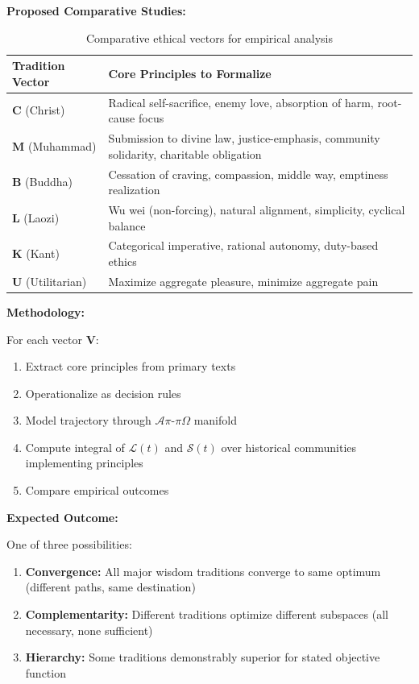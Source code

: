 \documentclass[11pt,a4paper]{article}
\theoremstyle{definition}
\theoremstyle{remark}
\begin{document}
\textbf{Proposed Comparative Studies:}

\begin{table}[h]
\centering
\small
\begin{tabular}{|l|p{7cm}|}
\hline
\textbf{Tradition Vector} & \textbf{Core Principles to Formalize} \\
\hline
$\mathbf{C}$ (Christ) & Radical self-sacrifice, enemy love, absorption of harm, root-cause focus \\
\hline
$\mathbf{M}$ (Muhammad) & Submission to divine law, justice-emphasis, community solidarity, charitable obligation \\
\hline
$\mathbf{B}$ (Buddha) & Cessation of craving, compassion, middle way, emptiness realization \\
\hline
$\mathbf{L}$ (Laozi) & Wu wei (non-forcing), natural alignment, simplicity, cyclical balance \\
\hline
$\mathbf{K}$ (Kant) & Categorical imperative, rational autonomy, duty-based ethics \\
\hline
$\mathbf{U}$ (Utilitarian) & Maximize aggregate pleasure, minimize aggregate pain \\
\hline
\end{tabular}
\caption{Comparative ethical vectors for empirical analysis}
\end{table}

\textbf{Methodology:}

For each vector $\mathbf{V}$:
\begin{enumerate}
\item Extract core principles from primary texts
\item Operationalize as decision rules
\item Model trajectory through $\mathcal{A}\pi\text{-}\pi\Omega$ manifold
\item Compute integral of $\mathcal{L}(t)$ and $\mathcal{S}(t)$ over historical communities implementing principles
\item Compare empirical outcomes
\end{enumerate}

\textbf{Expected Outcome:}

One of three possibilities:
\begin{enumerate}
\item \textbf{Convergence:} All major wisdom traditions converge to same optimum (different paths, same destination)
\item \textbf{Complementarity:} Different traditions optimize different subspaces (all necessary, none sufficient)
\item \textbf{Hierarchy:} Some traditions demonstrably superior for stated objective function
\end{enumerate}
\end{document}
